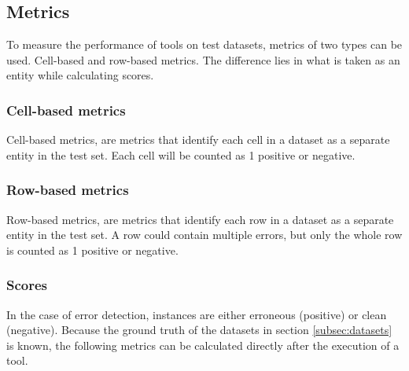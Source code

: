 \subsection{Metrics}
\label{subsec:metrics}
To measure the performance of tools on test datasets, metrics of two types can be used. Cell-based and row-based metrics. The difference lies in what is taken as an entity while calculating scores.

\subsubsection{Cell-based metrics}
Cell-based metrics, are metrics that identify each cell in a dataset as a separate entity in the test set. Each cell will be counted as 1 positive or negative. 

\subsubsection{Row-based metrics}
Row-based metrics, are metrics that identify each row in a dataset as a separate entity in the test set. A row could contain multiple errors, but only the whole row is counted as 1 positive or negative.

\subsubsection{Scores}
In the case of error detection, instances are either erroneous (positive) or clean (negative). Because the ground truth of the datasets in section \ref{subsec:datasets} is known, the following metrics can be calculated directly after the execution of a tool.

